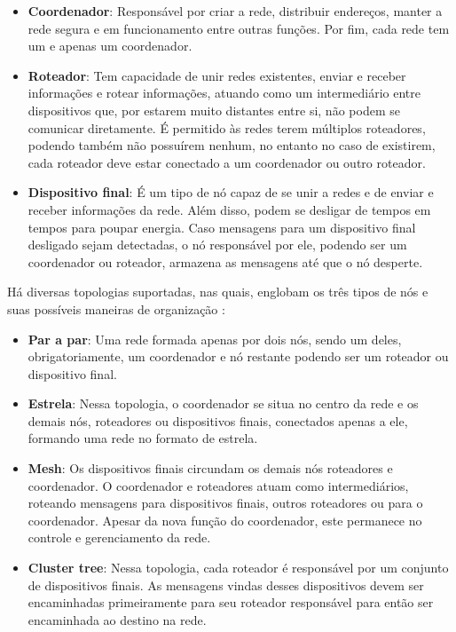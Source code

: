\begin{itemize} \parskip -4pt
	\item \textbf{Coordenador}: Responsável por criar a rede, distribuir endereços, manter a rede segura e em funcionamento entre outras funções. Por fim, cada rede tem um e apenas um coordenador.
	\item \textbf{Roteador}: Tem capacidade de unir redes existentes, enviar e receber informações e rotear 	informações, atuando como um intermediário entre dispositivos que, por estarem muito distantes entre si, não podem se comunicar diretamente. É permitido às redes terem múltiplos roteadores, podendo também não possuírem nenhum, no entanto no caso de existirem, cada roteador deve estar conectado a um coordenador ou outro roteador.
	\item \textbf{Dispositivo final}: É um tipo de nó capaz de se unir a redes e de enviar e receber 
	informações da rede. Além disso, podem se desligar de tempos em tempos para poupar energia. 
	Caso mensagens para um dispositivo final desligado sejam detectadas, o nó responsável por ele, 
	podendo ser um coordenador ou roteador, armazena as mensagens até que o nó desperte.
\end{itemize}

Há diversas topologias suportadas, nas quais, englobam os três tipos de nós e suas possíveis 
maneiras de organização \cite{Faludi2011}:

\begin{itemize} \parskip -4pt
	\item \textbf{Par a par}: Uma rede formada apenas por dois nós, sendo um deles, obrigatoriamente, um 
	coordenador e nó restante podendo ser um roteador ou dispositivo final.
	\item \textbf{Estrela}: Nessa topologia, o coordenador se situa no centro da rede e os demais nós, 
	roteadores ou dispositivos finais, conectados apenas a ele, formando uma rede no formato de 
	estrela.
	\item \textbf{Mesh}: Os dispositivos finais circundam os demais nós roteadores e coordenador. O 
	coordenador e roteadores atuam como intermediários, roteando mensagens para dispositivos 
	finais, outros roteadores ou para o coordenador. Apesar da nova função do coordenador, este 
	permanece no controle e gerenciamento da rede.
	\item \textbf{Cluster tree}: Nessa topologia, cada roteador é responsável por um conjunto de 
	dispositivos finais. As mensagens vindas desses dispositivos devem ser encaminhadas 
	primeiramente para seu roteador responsável para então ser encaminhada ao destino na rede.
\end{itemize}

